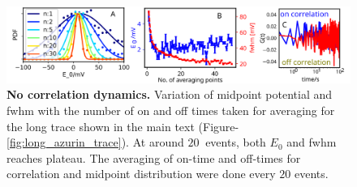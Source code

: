 \begin{figure}[!ht]
  \centering
  \includegraphics[width=\textwidth]{N_avgpoints_vs_fwhmwidth}
  \makeatletter
  \renewcommand{\fnum@figure}{\figurename~S\thefigure}
  \makeatother
  \caption{\textbf{No correlation dynamics.} Variation of midpoint potential and fwhm with the number of on and off times taken for averaging for the long trace shown in the main text (Figure-\ref{fig:long_azurin_trace}). At around $20~$ events, both $E_0$ and fwhm reaches plateau.
  The averaging of on-time and off-times for correlation and midpoint distribution were done every $20$ events.}
  \label{SIfig: N_avgpoints_vs_fwhmwidth}
\end{figure}


